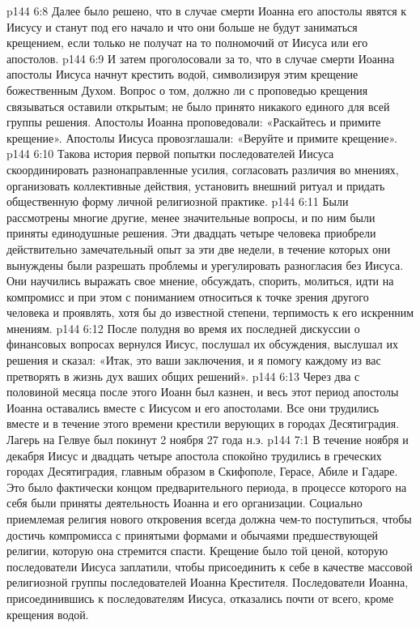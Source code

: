 \vs p144 6:8 Далее было решено, что в случае смерти Иоанна его апостолы явятся к Иисусу и станут под его начало и что они больше не будут заниматься крещением, если только не получат на то полномочий от Иисуса или его апостолов.
\vs p144 6:9 И затем проголосовали за то, что в случае смерти Иоанна апостолы Иисуса начнут крестить водой, символизируя этим крещение божественным Духом. Вопрос о том, должно ли с проповедью крещения связываться  оставили открытым; не было принято никакого единого для всей группы решения. Апостолы Иоанна проповедовали: «Раскайтесь и примите крещение». Апостолы Иисуса провозглашали: «Веруйте и примите крещение».
\vs p144 6:10 Такова история первой попытки последователей Иисуса скоординировать разнонаправленные усилия, согласовать различия во мнениях, организовать коллективные действия, установить внешний ритуал и придать общественную форму личной религиозной практике.
\vs p144 6:11 Были рассмотрены многие другие, менее значительные вопросы, и по ним были приняты единодушные решения. Эти двадцать четыре человека приобрели действительно замечательный опыт за эти две недели, в течение которых они вынуждены были разрешать проблемы и урегулировать разногласия без Иисуса. Они научились выражать свое мнение, обсуждать, спорить, молиться, идти на компромисс и при этом с пониманием относиться к точке зрения другого человека и проявлять, хотя бы до известной степени, терпимость к его искренним мнениям.
\vs p144 6:12 После полудня во время их последней дискуссии о финансовых вопросах вернулся Иисус, послушал их обсуждения, выслушал их решения и сказал: «Итак, это ваши заключения, и я помогу каждому из вас претворять в жизнь дух ваших общих решений».
\vs p144 6:13 Через два с половиной месяца после этого Иоанн был казнен, и весь этот период апостолы Иоанна оставались вместе с Иисусом и его апостолами. Все они трудились вместе и в течение этого времени крестили верующих в городах Десятиградия. Лагерь на Гелвуе был покинут 2 ноября 27 года н.э.
\vs p144 7:1 В течение ноября и декабря Иисус и двадцать четыре апостола спокойно трудились в греческих городах Десятиградия, главным образом в Скифополе, Герасе, Абиле и Гадаре. Это было фактически концом предварительного периода, в процессе которого на себя были приняты деятельность Иоанна и его организации. Социально приемлемая религия нового откровения всегда должна чем\hyp{}то поступиться, чтобы достичь компромисса с принятыми формами и обычаями предшествующей религии, которую она стремится спасти. Крещение было той ценой, которую последователи Иисуса заплатили, чтобы присоединить к себе в качестве массовой религиозной группы последователей Иоанна Крестителя. Последователи Иоанна, присоединившись к последователям Иисуса, отказались почти от всего, кроме крещения водой.
